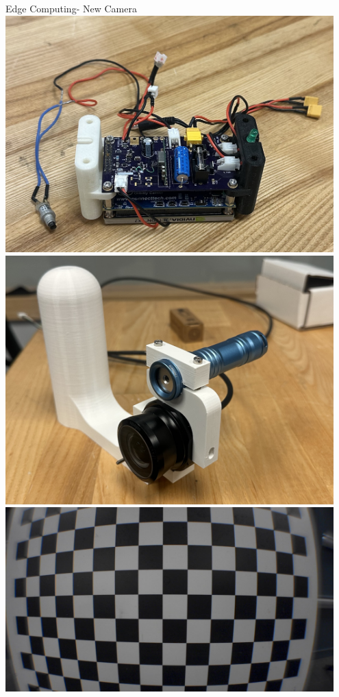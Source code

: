 \begin{frame}{Edge Computing- New Camera}
    \centering
    \includegraphics[height=0.8\textheight,width=0.95\textwidth,keepaspectratio]{images/IMG_4633.jpeg}
    \includegraphics[height=0.8\textheight,width=0.95\textwidth,keepaspectratio]{images/IMG_4635.jpeg}
    \includegraphics[height=0.8\textheight,width=0.95\textwidth,keepaspectratio]{images/close_exploreHD_screenshot_14.07.2025.png}
\end{frame}

